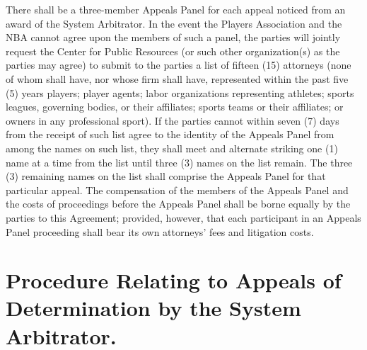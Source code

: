 \documentclass[
]{book}
\begin{document}
There shall be a three-member Appeals Panel for each appeal noticed from an award of the System Arbitrator. In the event the Players Association and the NBA cannot agree upon the members of such a panel, the parties will jointly request the Center for Public Resources (or such other organization(s) as the parties may agree) to submit to the parties a list of fifteen (15) attorneys (none of whom shall have, nor whose firm shall have, represented within the past five (5) years players; player agents; labor organizations representing athletes; sports leagues, governing bodies, or their affiliates; sports teams or their affiliates; or owners in any professional sport). If the parties cannot within seven (7) days from the receipt of such list agree to the identity of the Appeals Panel from among the names on such list, they shall meet and alternate striking one (1) name at a time from the list until three (3) names on the list remain. The three (3) remaining names on the list shall comprise the Appeals Panel for that particular appeal. The compensation of the members of the Appeals Panel and the costs of proceedings before the Appeals Panel shall be borne equally by the parties to this Agreement; provided, however, that each participant in an Appeals Panel proceeding shall bear its own attorneys' fees and litigation costs.

\hypertarget{procedure-relating-to-appeals-of-determination-by-the-system-arbitrator.}{%
\section{Procedure Relating to Appeals of Determination by the System Arbitrator.}\label{procedure-relating-to-appeals-of-determination-by-the-system-arbitrator.}}
\end{document}
